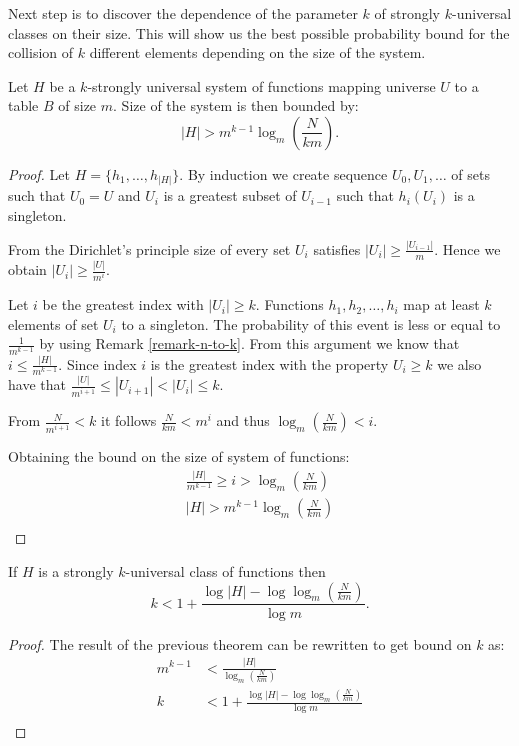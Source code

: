 Next step is to discover the dependence of the parameter $k$ of strongly $k$-universal classes on their size. This will show us the best possible probability bound for the collision of $k$ different elements depending on the size of the system.
\begin{theorem}
Let $H$ be a $k$-strongly universal system of functions mapping universe $U$ to a table $B$ of size $m$. Size of the system is then bounded by:
\begin{displaymath}
|H| > m^{k - 1} \log_m \left( \frac{N}{km} \right) \text{.}
\end{displaymath}
\end{theorem}
\begin{proof}
Let $H = \{h_1, \dots, h_{|H|}\}$. By induction we create sequence $U_0, U_1, \dots$ of sets such that $U_0 = U$ and $U_i$ is a greatest subset of $U_{i - 1}$ such that $h_i(U_i)$ is a singleton. 

From the Dirichlet's principle size of every set $U_i$ satisfies $|U_i| \geq \frac{|U_{i - 1}|}{m}$. Hence we obtain $|U_i| \geq \frac{|U|}{m^i}$.

Let $i$ be the greatest index with $|U_i| \geq k$. Functions $h_1, h_2,\dots, h_i$ map at least $k$ elements of set $U_i$ to a singleton. The probability of this event is less or equal to $\frac{1}{m ^ {k - 1}}$ by using Remark \ref{remark-n-to-k}. From this argument we know that $i \leq \frac{|H|}{m ^ {k - 1}}$. Since index $i$ is the greatest index with the property $U_i \geq k$ we also have that $\frac{|U|}{m ^ {i + 1}} \leq |U_{i + 1}| < |U_i| \leq k$. 

From $\frac{N}{m^{i + 1}} < k$ it follows $\frac{N}{km} < m ^ {i}$ and thus $\log_m \left( \frac{N}{km} \right) < i$.

Obtaining the bound on the size of system of functions:
\begin{gather*}
\frac{|H|}{m^{k - 1}} \geq i > \log_m \left( \frac{N}{km} \right) \\
|H| > m^{k - 1} \log_m \left( \frac{N}{km} \right) \\
\end{gather*}
\end{proof}

\begin{corollary}
If $H$ is a strongly $k$-universal class of functions then
\begin{displaymath}
k < 1 + \frac{\log |H| - \log \log_m \left( \frac{N}{km} \right)}{\log m} \textit{.}
\end{displaymath}
\end{corollary}
\begin{proof}
The result of the previous theorem can be rewritten to get bound on $k$ as:
\begin{displaymath}
\begin{split}
m^{k - 1} & < \frac{|H|}{\log_m \left( \frac{N}{km} \right)} \\
k & < 1 + \frac{\log |H| - \log \log_m \left( \frac{N}{km} \right)}{\log m} \\
\end{split}
\end{displaymath}
\end{proof}
